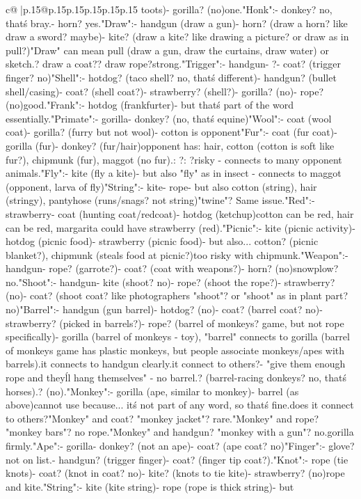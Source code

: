 \documentclass{article}
\begin{document}
{\begin{supertabular}{c@{$\;$}|p{.15\linewidth}@{}p{.15\linewidth}p{.15\linewidth}p{.15\linewidth}p{.15\linewidth}p{.15\linewidth}}
{{{toots)\n- gorilla? (no)\nOnly one.\n\n"Honk":\n- donkey? no, that\'s bray.\n- horn? yes.\n\n"Draw":\n- handgun (draw a gun)\n- horn? (draw a horn? like draw a sword? maybe)\n- kite? (draw a kite? like drawing a picture? or draw as in pull?)\n"Draw" can mean pull (draw a gun, draw the curtains, draw water) or sketch.\nCoat? draw a coat?\nRope? draw rope?\nNot strong.\n\n"Trigger":\n- handgun\n- ?\n- coat? (trigger finger? no)\n\n"Shell":\n- hotdog? (taco shell? no, that\'s different)\n- handgun? (bullet shell/casing)\n- coat? (shell coat?)\n- strawberry? (shell?)\n- gorilla? (no)\n- rope? (no)\nNot good.\n\n"Frank":\n- hotdog (frankfurter)\n- but that\'s part of the word essentially.\n\n"Primate":\n- gorilla\n- donkey? (no, that\'s equine)\n\n"Wool":\n- coat (wool coat)\n- gorilla? (furry but not wool)\n- cotton is opponent\n\n"Fur":\n- coat (fur coat)\n- gorilla (fur)\n- donkey? (fur/hair)\nBut opponent has: hair, cotton (cotton is soft like fur?), chipmunk (fur), maggot (no fur).\nDistractors: ?\nKill: ?\nToo risky - connects to many opponent animals.\n\n"Fly":\n- kite (fly a kite)\n- but also "fly" as in insect - connects to maggot (opponent, larva of fly)\n\n"String":\n- kite\n- rope\n- but also cotton (string), hair (stringy), pantyhose (runs/snags? not string)\nMaybe "twine"? Same issue.\n\n"Red":\n- strawberry\n- coat (hunting coat/redcoat)\n- hotdog (ketchup)\nBut cotton can be red, hair can be red, margarita could have strawberry (red).\n\n"Picnic":\n- kite (picnic activity)\n- hotdog (picnic food)\n- strawberry (picnic food)\n- but also... cotton? (picnic blanket?), chipmunk (steals food at picnic?)\nMaybe too risky with chipmunk.\n\n"Weapon":\n- handgun\n- rope? (garrote?)\n- coat? (coat with weapons?)\n- horn? (no)\nBut snowplow? no.\n\n"Shoot":\n- handgun\n- kite (shoot? no)\n- rope? (shoot the rope?)\n- strawberry? (no)\n- coat? (shoot coat? like photographers "shoot"? or "shoot" as in plant part? no)\n\n"Barrel":\n- handgun (gun barrel)\n- hotdog? (no)\n- coat? (barrel coat? no)\n- strawberry? (picked in barrels?)\n- rope? (barrel of monkeys? game, but not rope specifically)\n- gorilla (barrel of monkeys - toy)\nWait, "barrel" connects to gorilla (barrel of monkeys game has plastic monkeys, but people associate monkeys/apes with barrels).\nBut it connects to handgun clearly.\nDoes it connect to others?\nRope - "give them enough rope and they\'ll hang themselves" - no barrel.\nDonkey? (barrel-racing donkeys? no, that\'s horses).\nKite? (no).\n\n"Monkey":\n- gorilla (ape, similar to monkey)\n- barrel (as above)\nBut cannot use because... it\'s not part of any word, so that\'s fine.\nBut does it connect to others?\n"Monkey" and coat? "monkey jacket"? rare.\n"Monkey" and rope? "monkey bars"? no rope.\n"Monkey" and handgun? "monkey with a gun"? no.\nOnly gorilla firmly.\n\n"Ape":\n- gorilla\n- donkey? (not an ape)\n- coat? (ape coat? no)\n\n"Finger":\n- glove? not on list.\n- handgun? (trigger finger)\n- coat? (finger tip coat?)\nNo.\n\n"Knot":\n- rope (tie knots)\n- coat? (knot in coat? no)\n- kite? (knots to tie kite)\n- strawberry? (no)\nSo rope and kite.\n\n"String":\n- kite (kite string)\n- rope (rope is thick string)\n- but }}}
\end{supertabular}}
\end{document}
